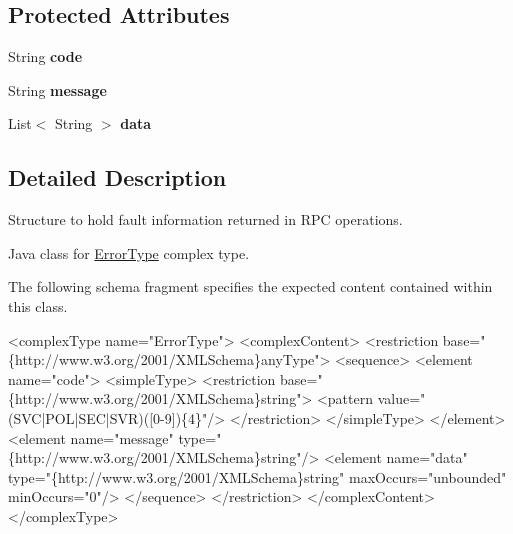 \subsection*{Protected Attributes}
\begin{DoxyCompactItemize}
\item 
\hypertarget{classcom_1_1telefonica_1_1schemas_1_1unica_1_1rpc_1_1definition_1_1v1_1_1ErrorType_aaac394ab29d184b0f9f05d4ac331c285}{
String {\bfseries code}}
\label{classcom_1_1telefonica_1_1schemas_1_1unica_1_1rpc_1_1definition_1_1v1_1_1ErrorType_aaac394ab29d184b0f9f05d4ac331c285}

\item 
\hypertarget{classcom_1_1telefonica_1_1schemas_1_1unica_1_1rpc_1_1definition_1_1v1_1_1ErrorType_ad0f86e52fcdc64a5090aef79bf90b335}{
String {\bfseries message}}
\label{classcom_1_1telefonica_1_1schemas_1_1unica_1_1rpc_1_1definition_1_1v1_1_1ErrorType_ad0f86e52fcdc64a5090aef79bf90b335}

\item 
\hypertarget{classcom_1_1telefonica_1_1schemas_1_1unica_1_1rpc_1_1definition_1_1v1_1_1ErrorType_ae92d3dcc97b38b7b09c2bdf5df52a1d3}{
List$<$ String $>$ {\bfseries data}}
\label{classcom_1_1telefonica_1_1schemas_1_1unica_1_1rpc_1_1definition_1_1v1_1_1ErrorType_ae92d3dcc97b38b7b09c2bdf5df52a1d3}

\end{DoxyCompactItemize}


\subsection{Detailed Description}
Structure to hold fault information returned in RPC operations.

Java class for \hyperlink{classcom_1_1telefonica_1_1schemas_1_1unica_1_1rpc_1_1definition_1_1v1_1_1ErrorType}{ErrorType} complex type.

The following schema fragment specifies the expected content contained within this class.


\begin{DoxyPre}
 <complexType name="ErrorType">
   <complexContent>
     <restriction base="\{http://www.w3.org/2001/XMLSchema\}anyType">
       <sequence>
         <element name="code">
           <simpleType>
             <restriction base="\{http://www.w3.org/2001/XMLSchema\}string">
               <pattern value="(SVC|POL|SEC|SVR)([0-9])\{4\}"/>
             </restriction>
           </simpleType>
         </element>
         <element name="message" type="\{http://www.w3.org/2001/XMLSchema\}string"/>
         <element name="data" type="\{http://www.w3.org/2001/XMLSchema\}string" maxOccurs="unbounded" minOccurs="0"/>
       </sequence>
     </restriction>
   </complexContent>
 </complexType>
 \end{DoxyPre}
 

